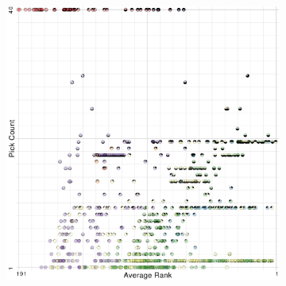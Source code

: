 

\begin{figure}[t]
\centering
\begin{subfigure}{0.24\linewidth}
\includegraphics[width=\linewidth]{infuse/ap}
\label{subfig:ap}
\end{subfigure}%
~%
\begin{subfigure}{0.24\linewidth}

\end{subfigure}
\end{figure}
